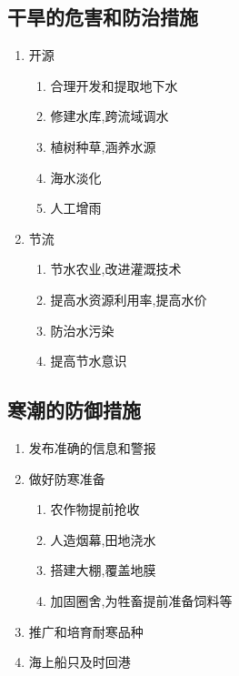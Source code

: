 \documentclass[a4paper]{article}
\begin{document}
    \subsection{干旱的危害和防治措施}
    \begin{enumerate}
        \item 开源
        \begin{enumerate}
            \item 合理开发和提取地下水
            \item 修建水库,跨流域调水
            \item 植树种草,涵养水源
            \item 海水淡化
            \item 人工增雨
        \end{enumerate}
        \item 节流
        \begin{enumerate}
            \item 节水农业,改进灌溉技术
            \item 提高水资源利用率,提高水价
            \item 防治水污染
            \item 提高节水意识
        \end{enumerate}
    \end{enumerate}
    \subsection{寒潮的防御措施}
    \begin{enumerate}
        \item 发布准确的信息和警报
        \item 做好防寒准备
        \begin{enumerate}
            \item 农作物提前抢收
            \item 人造烟幕,田地浇水
            \item 搭建大棚,覆盖地膜
            \item 加固圈舍,为牲畜提前准备饲料等
        \end{enumerate}
        \item 推广和培育耐寒品种
        \item 海上船只及时回港
    \end{enumerate}
\end{document}
